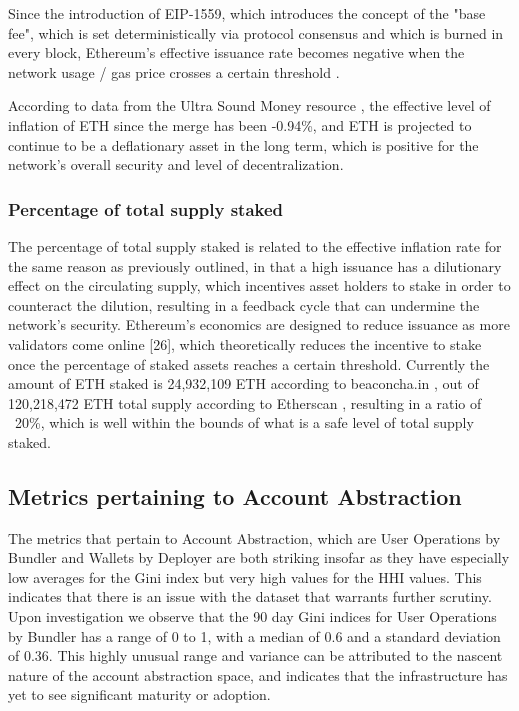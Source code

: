 \documentclass[conference]{IEEEtran}
\begin{document}
Since the introduction of EIP-1559, which introduces the concept of the "base fee", which is set deterministically via protocol consensus and which is burned in every block, Ethereum's effective issuance rate becomes negative when the network usage / gas price crosses a certain threshold \cite{ethereum2023-2}.

According to data from the Ultra Sound Money resource \cite{ultrasoundmoney2023}, the effective level of inflation of ETH since the merge has been -0.94\%, and ETH is projected to continue to be a deflationary asset in the long term, which is positive for the network's overall security and level of decentralization.

\subsubsection{Percentage of total supply staked}

The percentage of total supply staked is related to the effective inflation rate for the same reason as previously outlined, in that a high issuance has a dilutionary effect on the circulating supply, which incentives asset holders to stake in order to counteract the dilution, resulting in a feedback cycle that can undermine the network's security.  Ethereum’s economics are designed to reduce issuance as more validators come online [26], which theoretically reduces the incentive to stake once the percentage of staked assets reaches a certain threshold.  Currently the amount of ETH staked is 24,932,109 ETH according to beaconcha.in \cite{beaconchain2023}, out of 120,218,472 ETH total supply according to Etherscan \cite{etherscan2023}, resulting in a ratio of ~20\%, which is well within the bounds of what is  a safe level of total supply staked.

\subsection{Metrics pertaining to Account Abstraction}

The metrics that pertain to Account Abstraction, which are User Operations by Bundler and Wallets by Deployer are both striking insofar as they have especially low averages for the Gini index but very high values for the HHI values.  This indicates that there is an issue with the dataset that warrants further scrutiny.  Upon investigation we observe that the 90 day Gini indices for User Operations by Bundler has a range of 0 to 1, with a median of 0.6 and a standard deviation of 0.36.  This highly unusual range and variance can be attributed to the nascent nature of the account abstraction space, and indicates that the infrastructure has yet to see significant maturity or adoption.
\end{document}
